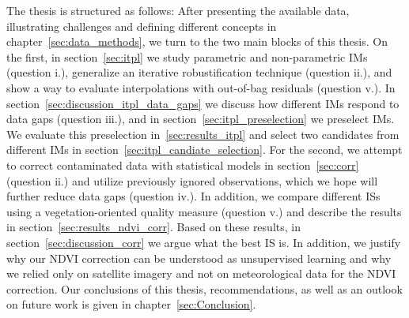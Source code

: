 The thesis is structured as follows: After presenting the available data, illustrating challenges and defining different concepts in chapter~\ref{sec:data_methods}, we turn to the two main blocks of this thesis. 
On the first, in section~\ref{sec:itpl} we study parametric and non-parametric {{IM}}s (question i.), generalize an iterative robustification technique (question ii.), and show a way to evaluate interpolations with out-of-bag residuals (question v.). In section~\ref{sec:discussion_itpl_data_gaps} we discuss how different {{IM}}s respond to data gaps (question iii.), and in section~\ref{sec:itpl_preselection} we preselect {{IM}}s. We evaluate this preselection in~\ref{sec:results_itpl} and select two candidates from different {{IM}}s in section~\ref{sec:itpl_candiate_selection}.
For the second, we attempt to correct contaminated data with statistical models in section~\ref{sec:corr} (question ii.) and utilize previously ignored observations, which we hope will further reduce data gaps (question iv.). In addition, we compare different {{ISs}} using a vegetation-oriented quality measure (question v.) and describe the results in section~\ref{sec:results_ndvi_corr}. Based on these results, in section~\ref{sec:discussion_corr} we argue what the best {{IS}} is. In addition, we justify why our NDVI correction can be understood as unsupervised learning and why we relied only on satellite imagery and not on meteorological data for the NDVI correction.
Our conclusions of this thesis, recommendations, as well as an outlook on future work is given in chapter~\ref{sec:Conclusion}. 








